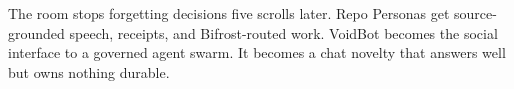 \ProjectionBand
{The room stops forgetting decisions five scrolls later.}
{Repo Personas get source-grounded speech, receipts, and Bifrost-routed work.}
{VoidBot becomes the social interface to a governed agent swarm.}
{It becomes a chat novelty that answers well but owns nothing durable.}

